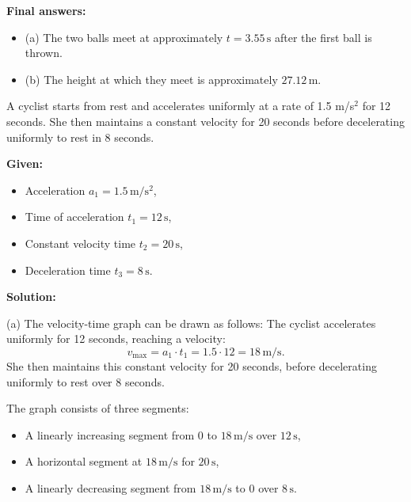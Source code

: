 \documentclass[addpoints]{exam}
\begin{document}
\begin{questions}
\begin{solution}[8cm]
\textbf{Final answers:}
\begin{itemize}
    \item (a) The two balls meet at approximately \(t = 3.55 \, \mathrm{s}\) after the first ball is thrown.
    \item (b) The height at which they meet is approximately \(27.12 \, \mathrm{m}\).
\end{itemize}
\end{solution}



\question A cyclist starts from rest and accelerates uniformly at a rate of 1.5 m/s$^2$ for 12 seconds. She then maintains a constant velocity for 20 seconds before decelerating uniformly to rest in 8 seconds.
\begin{solution}[7cm]
    \textbf{Given:}
\begin{itemize}
    \item Acceleration \(a_1 = 1.5 \, \mathrm{m/s^2}\),
    \item Time of acceleration \(t_1 = 12 \, \mathrm{s}\),
    \item Constant velocity time \(t_2 = 20 \, \mathrm{s}\),
    \item Deceleration time \(t_3 = 8 \, \mathrm{s}\).
\end{itemize}

\textbf{Solution:}

(a) The velocity-time graph can be drawn as follows:
The cyclist accelerates uniformly for 12 seconds, reaching a velocity:
\[
v_{\text{max}} = a_1 \cdot t_1 = 1.5 \cdot 12 = 18 \, \mathrm{m/s}.
\]
She then maintains this constant velocity for 20 seconds, before decelerating uniformly to rest over 8 seconds.

The graph consists of three segments:
\begin{itemize}
    \item A linearly increasing segment from \(0\) to \(18 \, \mathrm{m/s}\) over \(12 \, \mathrm{s}\),
    \item A horizontal segment at \(18 \, \mathrm{m/s}\) for \(20 \, \mathrm{s}\),
    \item A linearly decreasing segment from \(18 \, \mathrm{m/s}\) to \(0\) over \(8 \, \mathrm{s}\).
\end{itemize}


\end{solution}
\end{questions}
\end{document}
